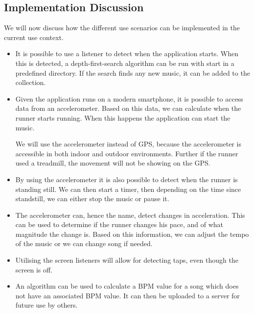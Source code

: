 \subsection{Implementation Discussion}
We will now discuss how the different use scenarios can be implemented in the current use context.
\begin{itemize}
	\item It is possible to use a listener to detect when the application starts. When this is detected, a depth-first-search algorithm can be run with start in a predefined directory. If the search finds any new music, it can be added to the collection.
	
	\item Given the application runs on a modern smartphone, it is possible to access data from an accelerometer. Based on this data, we can calculate when the runner starts running. When this happens the application can start the music.
	
	We will use the accelerometer instead of GPS, because the accelerometer is accessible in both indoor and outdoor environments. Further if the runner used a treadmill, the movement will not be showing on the GPS.
	
	\item By using the accelerometer it is also possible to detect when the runner is standing still. We can then start a timer, then depending on the time since standstill, we can either stop the music or pause it.
	
	\item The accelerometer can, hence the name, detect changes in acceleration.
	This can be used to determine if the runner changes his pace, and of what magnitude the change is.
	Based on this information, we can adjust the tempo of the music or we can change song if needed.
	
	\item Utilising the screen listeners will allow for detecting taps, even though the screen is off.
	
	\item An algorithm can be used to calculate a BPM value for a song which does not have an associated BPM value. It can then be uploaded to a server for future use by others. 
\end{itemize}
